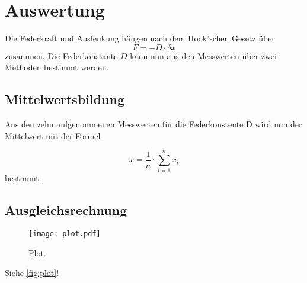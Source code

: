 \section{Auswertung}
\label{sec:Auswertung}

Die Federkraft und Auslenkung hängen nach dem Hook'schen Gesetz über
\begin{equation}
F=-D\cdot\delta x
\end{equation}
zusammen.
Die Federkonstante $D$ kann nun aus den Messwerten über zwei Methoden bestimmt werden.

\subsection{Mittelwertsbildung}
Aus den zehn aufgenommenen Messwerten für die Federkonstente D wird nun der Mittelwert mit der Formel

\begin{equation}
  \label{eq:Mittelwert}
  \bar{x} = \frac{1}{n} \cdot \sum_{i=1}^{n} x_i
\end{equation}
bestimmt. 

\subsection{Ausgleichsrechnung}


\begin{figure}
  \centering
  \texttt{[image: plot.pdf]}
  \caption{Plot.}
  \label{fig:plot}
\end{figure}


Siehe \autoref{fig:plot}!
